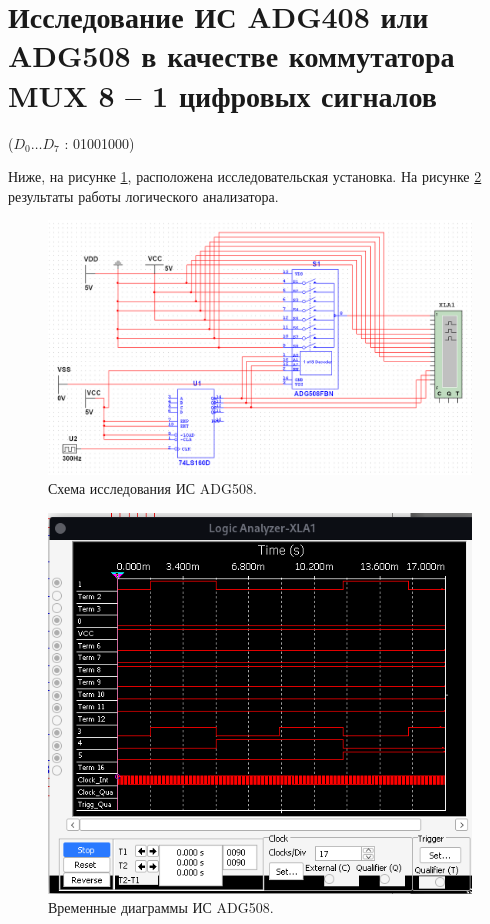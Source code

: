 \section{Исследование ИС ADG408 или ADG508 в качестве
коммутатора MUX 8 – 1 цифровых сигналов}

($D_0 \dots D_7$ : 01001000)

Ниже, на рисунке \ref{1}, расположена исследовательская установка. На рисунке \ref{2} результаты работы логического анализатора.

\begin{figure}[ht]
    \centering
    \includegraphics[width=\linewidth]{img/1.png}
    \caption{Схема исследования ИС ADG508.}
    \label{1}
\end{figure}

\begin{figure}[ht]
    \centering
    \includegraphics[width=\linewidth]{img/2.png}
    \caption{Временные диаграммы ИС ADG508.}
    \label{2}
\end{figure}


